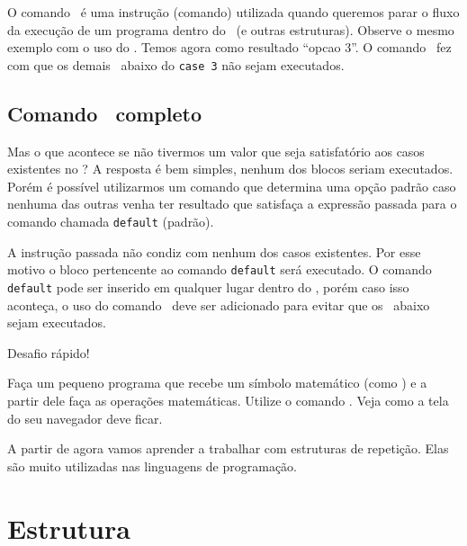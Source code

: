 O comando \comandobreak~é uma instrução (comando) utilizada quando queremos parar o fluxo da 
execução de um programa dentro do \comandoswitch~(e outras estruturas).
Observe o mesmo exemplo com o uso do \comandobreak. Temos agora como resultado ``opcao 3''. 
O comando \comandobreak~fez com que os demais \comandocase~abaixo do \texttt{case 3} 
não sejam executados.



\subsection{Comando \comandoswitch~completo}
\label{comando-switch-completo}

Mas o que acontece se não tivermos um valor que seja satisfatório aos casos 
existentes no \comandoswitch? A resposta é bem simples, nenhum dos blocos seriam executados.
Porém é possível utilizarmos um comando que determina uma opção padrão caso nenhuma das outras 
venha ter resultado que satisfaça a expressão passada para o comando \comandoswitch 
chamada \texttt{default} (padrão).



A instrução passada não condiz com nenhum dos casos existentes. Por esse motivo o bloco 
pertencente ao comando \texttt{default} será executado. O comando \texttt{default} pode ser 
inserido em qualquer lugar dentro do \comandoswitch, porém caso isso aconteça, 
o uso do comando \comandobreak~deve ser adicionado para evitar que os \comandocase~abaixo 
sejam executados.

{\Large Desafio rápido!}

Faça um pequeno programa que recebe um símbolo matemático (como \tipostring) e a partir dele
faça as operações matemáticas. Utilize o comando \comandoswitch. Veja como a tela do seu 
navegador deve ficar.


A partir de agora vamos aprender a trabalhar com estruturas de repetição. 
Elas são muito utilizadas nas linguagens de programação.

\section{Estrutura \comandowhile}
\label{estrutura-while}

